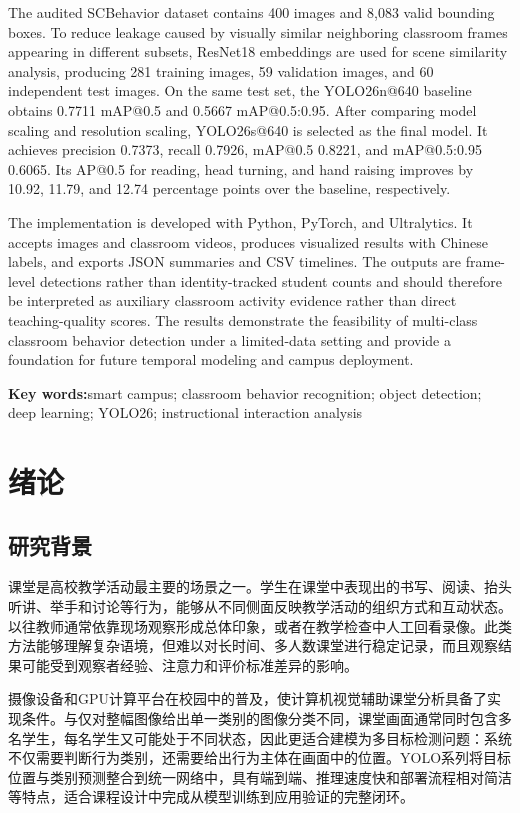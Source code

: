 \documentclass[12pt,hyperref,a4paper,UTF8]{ctexart}
\begin{document}
The audited SCBehavior dataset contains 400 images and 8,083 valid bounding boxes. To reduce leakage caused by visually similar neighboring classroom frames appearing in different subsets, ResNet18 embeddings are used for scene similarity analysis, producing 281 training images, 59 validation images, and 60 independent test images. On the same test set, the YOLO26n@640 baseline obtains 0.7711 mAP@0.5 and 0.5667 mAP@0.5:0.95. After comparing model scaling and resolution scaling, YOLO26s@640 is selected as the final model. It achieves precision 0.7373, recall 0.7926, mAP@0.5 0.8221, and mAP@0.5:0.95 0.6065. Its AP@0.5 for reading, head turning, and hand raising improves by 10.92, 11.79, and 12.74 percentage points over the baseline, respectively.\par
The implementation is developed with Python, PyTorch, and Ultralytics. It accepts images and classroom videos, produces visualized results with Chinese labels, and exports JSON summaries and CSV timelines. The outputs are frame-level detections rather than identity-tracked student counts and should therefore be interpreted as auxiliary classroom activity evidence rather than direct teaching-quality scores. The results demonstrate the feasibility of multi-class classroom behavior detection under a limited-data setting and provide a foundation for future temporal modeling and campus deployment.\par
\par\noindent\textbf{Key words:}smart campus; classroom behavior recognition; object detection; deep learning; YOLO26; instructional interaction analysis
\newpage
\tableofcontents
\newpage
{}
\setcounter{page}{1}
\section{绪论}
\subsection{研究背景}
课堂是高校教学活动最主要的场景之一。学生在课堂中表现出的书写、阅读、抬头听讲、举手和讨论等行为，能够从不同侧面反映教学活动的组织方式和互动状态。以往教师通常依靠现场观察形成总体印象，或者在教学检查中人工回看录像。此类方法能够理解复杂语境，但难以对长时间、多人数课堂进行稳定记录，而且观察结果可能受到观察者经验、注意力和评价标准差异的影响。\par
摄像设备和GPU计算平台在校园中的普及，使计算机视觉辅助课堂分析具备了实现条件。与仅对整幅图像给出单一类别的图像分类不同，课堂画面通常同时包含多名学生，每名学生又可能处于不同状态，因此更适合建模为多目标检测问题：系统不仅需要判断行为类别，还需要给出行为主体在画面中的位置。YOLO系列将目标位置与类别预测整合到统一网络中，具有端到端、推理速度快和部署流程相对简洁等特点，适合课程设计中完成从模型训练到应用验证的完整闭环。\par
\end{document}
